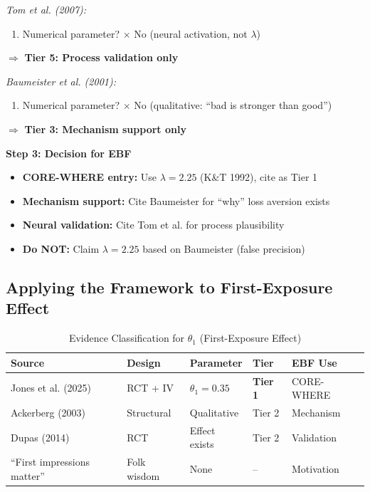 \documentclass[11pt, a4paper]{article}
\begin{document}
\begin{tcolorbox}[colback=yellow!5!white, colframe=yellow!75!black,
    title=Worked Example: How to Classify Evidence for $\lambda$ (Loss Aversion)]
\textit{Tom et al. (2007):}
\begin{enumerate}[nosep]
\item Numerical parameter? $\times$ No (neural activation, not $\lambda$)
\end{enumerate}
$\Rightarrow$ \textbf{Tier 5: Process validation only}

\textit{Baumeister et al. (2001):}
\begin{enumerate}[nosep]
\item Numerical parameter? $\times$ No (qualitative: ``bad is stronger than good'')
\end{enumerate}
$\Rightarrow$ \textbf{Tier 3: Mechanism support only}

\textbf{Step 3: Decision for EBF}

\begin{itemize}[nosep]
\item \textbf{CORE-WHERE entry:} Use $\lambda = 2.25$ (K\&T 1992), cite as Tier 1
\item \textbf{Mechanism support:} Cite Baumeister for ``why'' loss aversion exists
\item \textbf{Neural validation:} Cite Tom et al. for process plausibility
\item \textbf{Do NOT:} Claim $\lambda = 2.25$ based on Baumeister (false precision)
\end{itemize}

\end{tcolorbox}

\subsection{Applying the Framework to First-Exposure Effect}

\begin{table}[htbp]
\centering
\caption{Evidence Classification for $\theta_1$ (First-Exposure Effect)}
\label{tab:evd-theta1-classification}
\renewcommand{\arraystretch}{1.3}
\begin{tabular}{@{}p{3.5cm}p{2.5cm}p{2cm}p{2cm}p{2cm}@{}}
\toprule
\textbf{Source} & \textbf{Design} & \textbf{Parameter} & \textbf{Tier} & \textbf{EBF Use} \\
\midrule
Jones et al. (2025) & RCT + IV & $\theta_1 = 0.35$ & \textbf{Tier 1} & CORE-WHERE \\
Ackerberg (2003) & Structural & Qualitative & Tier 2 & Mechanism \\
Dupas (2014) & RCT & Effect exists & Tier 2 & Validation \\
``First impressions matter'' & Folk wisdom & None & -- & Motivation \\
\bottomrule
\end{tabular}
\end{table}
\end{document}
